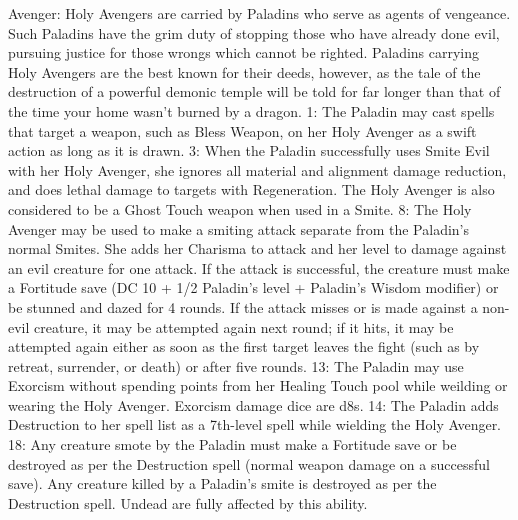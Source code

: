{Avenger:
Holy Avengers are carried by Paladins who serve as agents of vengeance.  Such Paladins have the grim duty of stopping those who have already done evil, pursuing justice for those wrongs which cannot be righted.  Paladins carrying Holy Avengers are the best known for their deeds, however, as the tale of the destruction of a powerful demonic temple will be told for far longer than that of the time your home wasn't burned by a dragon.
1: The Paladin may cast spells that target a weapon, such as Bless Weapon, on her Holy Avenger as a swift action as long as it is drawn.
3: When the Paladin successfully uses Smite Evil with her Holy Avenger, she ignores all material and alignment damage reduction, and does lethal damage to targets with Regeneration.  The Holy Avenger is also considered to be a Ghost Touch weapon when used in a Smite.
8: The Holy Avenger may be used to make a smiting attack separate from the Paladin's normal Smites.  She adds her Charisma to attack and her level to damage against an evil creature for one attack.  If the attack is successful, the creature must make a Fortitude save (DC 10 + 1/2 Paladin's level + Paladin's Wisdom modifier) or be stunned and dazed for 4 rounds.  If the attack misses or is made against a non-evil creature, it may be attempted again next round; if it hits, it may be attempted again either as soon as the first target leaves the fight (such as by retreat, surrender, or death) or after five rounds.
13: The Paladin may use Exorcism without spending points from her Healing Touch pool while weilding or wearing the Holy Avenger.  Exorcism damage dice are d8s.
14: The Paladin adds Destruction to her spell list as a 7th-level spell while wielding the Holy Avenger.
18: Any creature smote by the Paladin must make a Fortitude save or be destroyed as per the Destruction spell (normal weapon damage on a successful save).  Any creature killed by a Paladin's smite is destroyed as per the Destruction spell.  Undead are fully affected by this ability.

}
